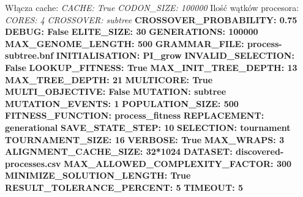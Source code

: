 Włącza cache: \newline
\textit{CACHE:                         True} \newline
\textit{CODON\_SIZE:                   100000} \newline
Ilość wątków procesora:
\textit{CORES:                         4} \newline
\textit{CROSSOVER:                     subtree} \newline
\textbf{CROSSOVER\_PROBABILITY:         0.75} \newline
\textbf{DEBUG:                         False} \newline
\textbf{ELITE\_SIZE:                   30} \newline
\textbf{GENERATIONS:                   100000} \newline
\textbf{MAX\_GENOME\_LENGTH:           500} \newline
\textbf{GRAMMAR\_FILE:                  process-subtree.bnf} \newline
\textbf{INITIALISATION:                 PI\_grow} \newline
\textbf{INVALID\_SELECTION:              False} \newline
\textbf{LOOKUP\_FITNESS:                 True} \newline
\textbf{MAX\_INIT\_TREE\_DEPTH:            13} \newline
\textbf{MAX\_TREE\_DEPTH:                 21} \newline
\textbf{MULTICORE:                      True} \newline
\textbf{MULTI\_OBJECTIVE:                False} \newline
\textbf{MUTATION:                       subtree} \newline
\textbf{MUTATION\_EVENTS:                1} \newline
\textbf{POPULATION\_SIZE:                500} \newline
\textbf{FITNESS\_FUNCTION:               process\_fitness} \newline
\textbf{REPLACEMENT:                    generational} \newline
\textbf{SAVE\_STATE\_STEP:                10} \newline
\textbf{SELECTION:                      tournament} \newline
\textbf{TOURNAMENT\_SIZE:                16} \newline
\textbf{VERBOSE:                        True} \newline
\textbf{MAX\_WRAPS:                      3} \newline
\textbf{ALIGNMENT\_CACHE\_SIZE:           32*1024} \newline
\textbf{DATASET:                        discovered-processes.csv} \newline
\textbf{MAX\_ALLOWED\_COMPLEXITY\_FACTOR:  300} \newline
\textbf{MINIMIZE\_SOLUTION\_LENGTH:       True} \newline
\textbf{RESULT\_TOLERANCE\_PERCENT:       5} \newline
\textbf{TIMEOUT:                        5} \newline


